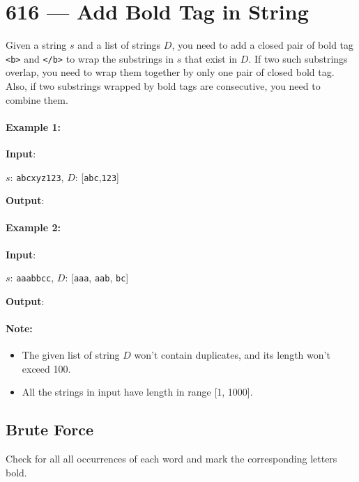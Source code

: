 \section{616 --- Add Bold Tag in String}
Given a string $s$ and a list of strings $D$, you need to add a closed pair of bold tag \texttt{<b>} and \texttt{</b>} to wrap the substrings in $s$ that exist in $D$. If two such substrings overlap, you need to wrap them together by only one pair of closed bold tag. Also, if two substrings wrapped by bold tags are consecutive, you need to combine them.

\paragraph{Example 1:}

\begin{flushleft}
\textbf{Input}:
 
$s$: \texttt{abcxyz123}, $D$: [\texttt{abc},\texttt{123}]

\textbf{Output}:


\end{flushleft}

\paragraph{Example 2:}

\begin{flushleft}
\textbf{Input}:
 
$s$: \texttt{aaabbcc}, $D$: [\texttt{aaa}, \texttt{aab}, \texttt{bc}]

\textbf{Output}:

\end{flushleft}

\paragraph{Note:}

\begin{itemize}
\item The given list of string $D$ won't contain duplicates, and its length won't exceed 100.
\item All the strings in input have length in range [1, 1000].
\end{itemize}

\subsection{Brute Force}
Check for all all occurrences of each word and mark the corresponding letters bold.

